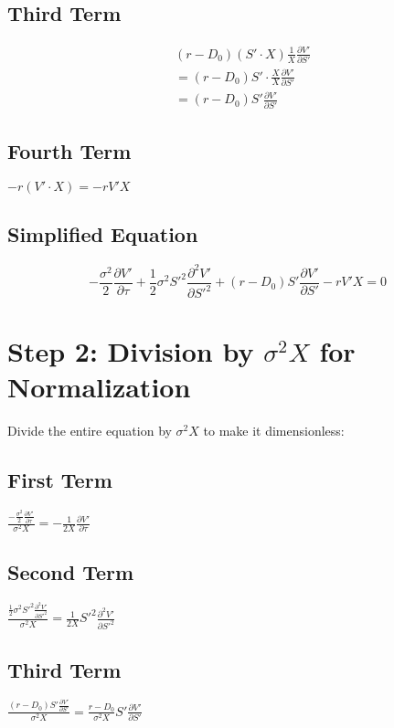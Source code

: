 \documentclass{article}
\begin{document}
\subsection*{Third Term}
\begin{align*}
&(r - D_0) (S' \cdot X) \frac{1}{X} \frac{\partial V'}{\partial S'} \\
&= (r - D_0) S' \cdot \frac{X}{X} \frac{\partial V'}{\partial S'} \\
&= (r - D_0) S' \frac{\partial V'}{\partial S'}
\end{align*}

\subsection*{Fourth Term}
$- r (V' \cdot X) = -r V' X$

\subsection*{Simplified Equation}
\begin{equation}
-\frac{\sigma^2}{2} \frac{\partial V'}{\partial \tau} + \frac{1}{2} \sigma^2 S'^2 \frac{\partial^2 V'}{\partial S'^2} + (r - D_0) S' \frac{\partial V'}{\partial S'} - r V' X = 0
\end{equation}

\section*{Step 2: Division by $\sigma^2 X$ for Normalization}
Divide the entire equation by $\sigma^2 X$ to make it dimensionless:

\subsection*{First Term}
$\frac{-\frac{\sigma^2}{2} \frac{\partial V'}{\partial \tau}}{\sigma^2 X} = -\frac{1}{2X} \frac{\partial V'}{\partial \tau}$

\subsection*{Second Term}
$\frac{\frac{1}{2} \sigma^2 S'^2 \frac{\partial^2 V'}{\partial S'^2}}{\sigma^2 X} = \frac{1}{2X} S'^2 \frac{\partial^2 V'}{\partial S'^2}$

\subsection*{Third Term}
$\frac{(r - D_0) S' \frac{\partial V'}{\partial S'}}{\sigma^2 X} = \frac{r - D_0}{\sigma^2 X} S' \frac{\partial V'}{\partial S'}$
\end{document}
